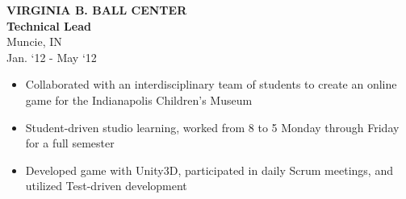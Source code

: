 \documentclass[a4paper,10pt]{article}
\newenvironment{details}
{\begin{itemize}[label=\scalebox{.5}{\ding{117}},leftmargin=0.15in]}
{\end{itemize}}
\begin{document}
\begin{minipage}[t]{0.5\textwidth}
\textbf{VIRGINIA B. BALL CENTER\\Technical Lead}\\
Muncie, IN\\
Jan. ‘12 - May ‘12

\begin{details}
  \item Collaborated with an interdisciplinary team of students to create
an online game for the Indianapolis Children’s Museum
  \item Student-driven studio learning, worked from 8 to 5 Monday
through Friday for a full semester
  \item Developed game with Unity3D, participated in daily Scrum meetings, and utilized Test-driven
development
\end{details}

\end{minipage}
\hspace{0.35 in}
\end{document}
